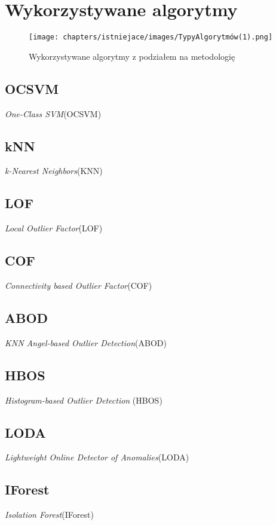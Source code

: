 \section{Wykorzystywane algorytmy}

\begin{figure}
    \centering
    \texttt{[image: chapters/istniejace/images/TypyAlgorytmów(1).png]}
    \caption{Wykorzystywane algorytmy z podziałem na metodologię}
    \label{fig:typy}
\end{figure}
\subsection{OCSVM}
\textit{One-Class SVM}(OCSVM) \cite{ocsvm}
\subsection{kNN}
\textit{k-Nearest Neighbors}(KNN) \cite{knn}
\subsection{LOF}
\textit{Local Outlier Factor}(LOF) \cite{lof}
\subsection{COF}
\textit{Connectivity based Outlier Factor}(COF) \cite{cof}
\subsection{ABOD}
\textit{KNN Angel-based Outlier Detection}(ABOD) \cite{abod}
\subsection{HBOS}
\textit{Histogram-based Outlier Detection} (HBOS) \cite{hbos}
\subsection{LODA}
\textit{Lightweight Online Detector of Anomalies}(LODA) \cite{loda}
\subsection{IForest}
\textit{Isolation Forest}(IForest) \cite{iforest}
\label{sub:IF}
